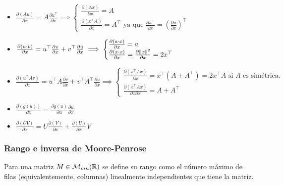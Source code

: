 \begin{itemize}
	\item $\frac{\partial (Au)}{\partial x} = A\frac{\partial u^\top }{\partial x} \implies \begin{cases}
		\frac{\partial (Ax)}{\partial x}=A\\
		\frac{\partial (x^\top A)}{\partial x} = A^\top  \text{ ya que } \frac{\partial u^\top }{\partial x} = \left( \frac{\partial u}{\partial x}\right)^\top 
	\end{cases}$
	
	\item $\frac{\partial (u\cdot v)}{\partial x} = u^\top \frac{\partial v}{\partial x} + v^\top  \frac{\partial u}{\partial x} \implies \begin{cases}
 	\frac{\partial (a\cdot x)}{\partial x} = a\\
 	\frac{\partial (x\cdot x)}{\partial x} = \frac{\partial \left\lVert x\right\rVert^2}{\partial x} = 2x^\top 
 \end{cases}$ 
 
 \item $\frac{\partial (u^\top A v)}{\partial x} = u^\top A \frac{\partial v}{\partial x} + v^\top A^\top  \frac{\partial u}{\partial x} \implies \begin{cases}
 	\frac{\partial (x^\top Ax)}{\partial x} = x^\top(A+A^\top)=2x^\top A\text{ si $A$ es simétrica}.\\
 	\frac{\partial (x^\top Ax)}{\partial x \partial x} = A + A^\top
 \end{cases}$ 
 
  	\item $\frac{\partial (g(u))}{\partial x} = \frac{\partial g(u)}{\partial u} \frac{\partial u}{\partial x}$
  	
  	\item $\frac{\partial (UV)}{\partial x} = U \frac{\partial (V)}{\partial x} + \frac{\partial (U)}{\partial x}V$
  
\end{itemize}


\subsubsection{Rango e inversa de Moore-Penrose}

\begin{definition}[rango]
	Para una matriz $M\in\mathcal{M}_{mn}(\mathbb{R})$ se define su rango como el número máximo de filas (equivalentemente, columnas) linealmente independientes que tiene la matriz.
\end{definition}

